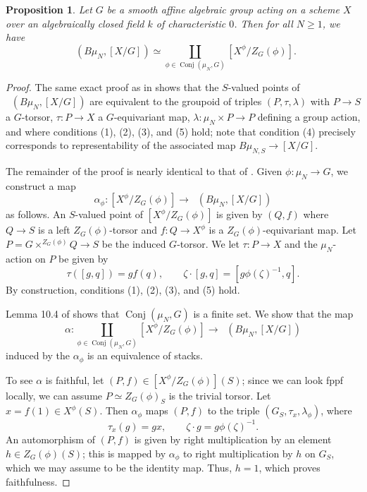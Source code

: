 \documentclass[12pt,a4paper]{amsart}
\newtheorem{proposition}[proposition]{Proposition}
\theoremstyle{definition}
\renewcommand{\1}{\textbf{1}}
\newcommand{\<}{\langle}
\renewcommand{\>}{\rangle}
\DeclareMathOperator{\Hom}{Hom}
\DeclareMathOperator{\uHom}{\underline{\Hom}}
\DeclareMathOperator{\Conj}{Conj}
\begin{document}
\begin{proposition}\label{prop:cyc-inertia-VmodG}
Let $G$ be a smooth affine algebraic group acting on a scheme $X$ over an algebraically closed field $k$ of characteristic $0$. Then for all $N\geq1$, we have
\[
	\uHom(B\mu_N,[X/G]) \simeq \coprod_{\phi\in\Conj(\mu_N,G)} [X^\phi/Z_G(\phi)].
\]
\end{proposition}
\begin{proof}
The same exact proof as in \cite[Proposition 10.2]{HuangSatrianoUsatine} shows that the $S$-valued points of $\uHom(B\mu_N,[X/G])$ are equivalent to the groupoid of triples $(P,\tau,\lambda)$ with $P\to S$ a $G$-torsor, $\tau\colon P\to X$ a $G$-equivariant map, $\lambda\colon\mu_N\times P\to P$ defining a group action, and where conditions (1), (2), (3), and (5) hold; note that condition (4) precisely corresponds to representability of the associated map $B\mu_{N,S}\to[X/G]$.

The remainder of the proof is nearly identical to that of \cite[Theorem 10.1]{HuangSatrianoUsatine}. Given $\phi\colon\mu_N\to G$, we construct a map
\[
    \alpha_\phi\colon [X^\phi/Z_G(\phi)]\to \uHom(B\mu_N,[X/G])
\]
as follows. An $S$-valued point of $[X^\phi/Z_G(\phi)]$ is given by $(Q,f)$ where $Q\to S$ is a left $Z_G(\phi)$-torsor and $f\colon Q\to X^\phi$ is a $Z_G(\phi)$-equivariant map. Let $P=G\times^{Z_G(\phi)}Q\to S$ be the induced $G$-torsor. We let $\tau\colon P\to X$ and the $\mu_N$-action on $P$ be given by
\[
	\tau([g,q])=gf(q),\qquad\zeta\cdot[g,q]=[g\phi(\zeta)^{-1},q].
\]
By construction, conditions (1), (2), (3), and (5) hold.

Lemma 10.4 of \cite{HuangSatrianoUsatine} shows that $\Conj(\mu_N,G)$ is a finite set. We show that the map
\[
    \alpha\colon\coprod_{\phi\in\Conj(\mu_N,G)}[X^\phi/Z_G(\phi)]\to \uHom(B\mu_N,[X/G])
\]
induced by the $\alpha_\phi$ is an equivalence of stacks.

To see $\alpha$ is faithful, let $(P,f)\in[X^\phi/Z_G(\phi)](S)$; since we can look fppf locally, we can assume $P\simeq Z_G(\phi)_S$ is the trivial torsor. Let $x=f(1)\in X^\phi(S)$. Then $\alpha_\phi$ maps $(P,f)$ to the triple $(G_S,\tau_x,\lambda_\phi)$, where
\[
	\tau_x(g)=gx,\qquad\zeta\cdot g=g\phi(\zeta)^{-1}.
\]
An automorphism of $(P,f)$ is given by right multiplication by an element $h\in Z_G(\phi)(S)$; this is mapped by $\alpha_\phi$ to right multiplication by $h$ on $G_S$, which we may assume to be the identity map. Thus, $h=1$, which proves faithfulness.


\end{proof}
\end{document}

